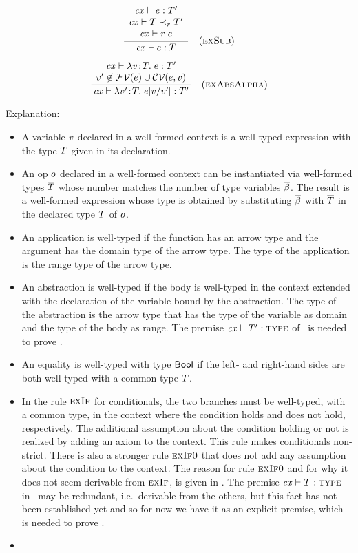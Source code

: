 \[
\frac{\begin{array}{c}\mathit{cx}\vdash e:T'\\\mathit{cx}\vdash T\prec_{r}T'\\\mathit{cx}\vdash r\;e\end{array}}{\mathit{cx}\vdash e:T}\quad\mbox{(\textsc{exSub})}
\]

\[
\frac{\begin{array}{c}\mathit{cx}\vdash\lambda v\!:\!T.\;e:T'\\v'\not\in\mathcal{FV}(e)\cup\mathcal{CV}(e,v)\end{array}}{\mathit{cx}\vdash\lambda v'\!:\!T.\;e[v/v']:T'}\quad\mbox{(\textsc{exAbsAlpha})}
\]

Explanation:
\begin{itemize}
\item
A variable $v$ declared in a well-formed context is a well-typed expression
with the type $T$ given in its declaration.
\item
An op $o$ declared in a well-formed context can be instantiated via
well-formed types $\overline{T}$ whose number matches the number of type variables
$\overline{\beta}$. The result is a well-formed expression whose type is obtained by
substituting $\overline{\beta}$ with $\overline{T}$ in the declared type $T$ of $o$.
\item
An application is well-typed if the function has an arrow type and the
argument has the domain type of the arrow type. The type of the application is
the range type of the arrow type.
\item
An abstraction is well-typed if the body is well-typed in the context extended
with the declaration of the variable bound by the abstraction. The type of the
abstraction is the arrow type that has the type of the variable as domain and
the type of the body as range. The premise $\mathit{cx}\vdash T':\textsc{type}$ of \Reabs\ is
needed to prove .
\item
An equality is well-typed with type $\mathsf{Bool}$ if the left- and right-hand sides
are both well-typed with a common type $T$.
\item
In the rule $\textsc{exIf}$ for conditionals, the two branches must be well-typed,
with a common type, in the context where the condition holds and does not
hold, respectively. The additional assumption about the condition holding or
not is realized by adding an axiom to the context. This rule makes
conditionals non-strict. There is also a stronger rule $\textsc{exIf0}$ that does not
add any assumption about the condition to the context. The reason for rule
$\textsc{exIf0}$ and for why it does not seem derivable from $\textsc{exIf}$, is given in
. The premise $\mathit{cx}\vdash T:\textsc{type}$ in \Reif\ may be redundant, i.e.\
derivable from the others, but this fact has not been established yet and so
for now we have it as an explicit premise, which is needed to prove
\thmref{thm-exty-wf}.
\item

\end{itemize}
